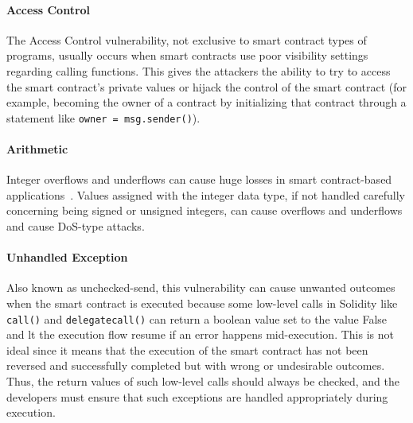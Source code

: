             \paragraph{Access Control}
            The Access Control vulnerability, not exclusive to smart contract types of programs, usually occurs when smart contracts use poor visibility settings regarding calling functions.
            This gives the attackers the ability to try to access the smart contract's private values or hijack the control of the smart contract (for example, becoming the owner of a contract by initializing that contract through a statement like \texttt{owner = msg.sender()}).

            \paragraph{Arithmetic}
            Integer overflows and underflows can cause huge losses in smart contract-based applications~\cite{arithmeticVuln}.
            Values assigned with the integer data type, if not handled carefully concerning being signed or unsigned integers, can cause overflows and underflows and cause DoS-type attacks.
            
            \paragraph{Unhandled Exception}
            Also known as unchecked-send, this vulnerability can cause unwanted outcomes when the smart contract is executed because some low-level calls in Solidity like \texttt{call()} and \texttt{delegatecall()} can return a boolean value set to the value False and lt the execution flow resume if an error happens mid-execution.
            This is not ideal since it means that the execution of the smart contract has not been reversed and successfully completed but with wrong or undesirable outcomes.
            Thus, the return values of such low-level calls should always be checked, and the developers must ensure that such exceptions are handled appropriately during execution.
            
